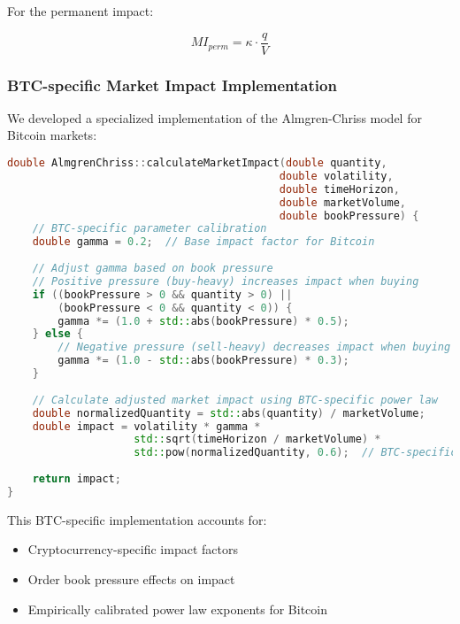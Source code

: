 \documentclass[10pt,twocolumn,a4paper]{IEEEtran}
\begin{document}
For the permanent impact:

\begin{equation}
MI_{perm} = \kappa \cdot \frac{q}{V}
\end{equation}

\subsubsection{BTC-specific Market Impact Implementation}

We developed a specialized implementation of the Almgren-Chriss model for Bitcoin markets:

\begin{lstlisting}[language=C++, caption=BTC-specific Market Impact Implementation]
double AlmgrenChriss::calculateMarketImpact(double quantity, 
                                           double volatility,
                                           double timeHorizon,
                                           double marketVolume,
                                           double bookPressure) {
    // BTC-specific parameter calibration
    double gamma = 0.2;  // Base impact factor for Bitcoin
    
    // Adjust gamma based on book pressure
    // Positive pressure (buy-heavy) increases impact when buying
    if ((bookPressure > 0 && quantity > 0) || 
        (bookPressure < 0 && quantity < 0)) {
        gamma *= (1.0 + std::abs(bookPressure) * 0.5);
    } else {
        // Negative pressure (sell-heavy) decreases impact when buying
        gamma *= (1.0 - std::abs(bookPressure) * 0.3);
    }
    
    // Calculate adjusted market impact using BTC-specific power law
    double normalizedQuantity = std::abs(quantity) / marketVolume;
    double impact = volatility * gamma * 
                    std::sqrt(timeHorizon / marketVolume) * 
                    std::pow(normalizedQuantity, 0.6);  // BTC-specific exponent
                    
    return impact;
}
\end{lstlisting}

This BTC-specific implementation accounts for:
\begin{itemize}
    \item Cryptocurrency-specific impact factors
    \item Order book pressure effects on impact
    \item Empirically calibrated power law exponents for Bitcoin
\end{itemize}
\end{document}
